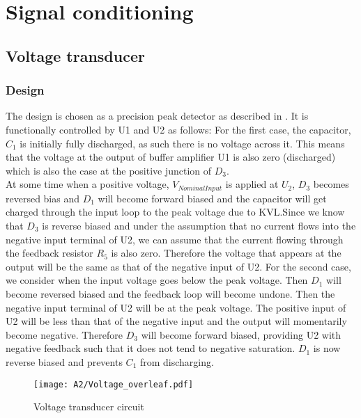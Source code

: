 \chapter{Signal conditioning}

\section{Voltage transducer} \label{sec:vtrans}

\subsection{Design} \label{sec:vtrans_design}

The design is chosen as a precision peak detector as described in \cite{voltage_peak_detector}. It is functionally controlled by U1 and U2 as follows: For the first case, the capacitor, $C_1$ is initially fully discharged, as such there is no voltage across it. This means that the voltage at the output of buffer amplifier U1 is also zero (discharged) which is also the case at the positive junction of $D_3$.\\At some time when a positive voltage, $V_{Nominal Input}$ is applied at $U_2$, $D_3$ becomes reversed bias and $D_1$ will become forward biased and the capacitor will get charged through the input loop to the peak voltage due to KVL.Since we know that $D_3$ is reverse biased and under the assumption that no current flows into the  negative input terminal of U2, we can assume that the current flowing through the feedback resistor $R_5$ is also zero. Therefore the voltage that appears at the output will be the same as that of the negative input of U2. For the second case, we consider when the input voltage goes below the peak voltage. Then $D_1$ will become reversed biased and the feedback loop will become undone. Then the negative input terminal of U2 will be at the peak voltage. The positive input of U2 will be less than that of the negative input and the output will momentarily become negative. Therefore $D_3$ will become forward biased, providing U2 with negative feedback such that it does not tend to negative saturation.
$D_1$ is now reverse biased and prevents $C_1$ from discharging. 

\begin{figure}[H]
    \centering
    \texttt{[image: A2/Voltage\_overleaf.pdf]}
    \caption{Voltage transducer circuit}
    \label{fig:voltage_system}
\end{figure}


